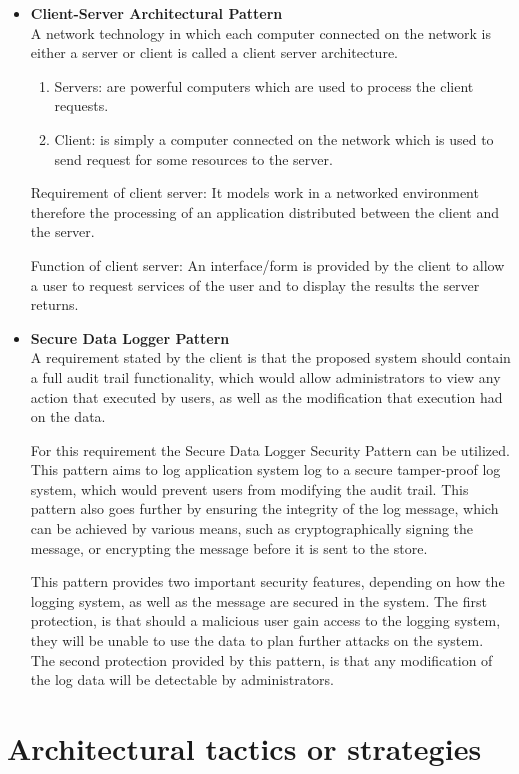 \documentclass[a4paper,10pt]{article}
\begin{document}
\begin{itemize}
		\item \textbf{Client-Server Architectural Pattern}\\
				A network technology in which each computer connected on the network is either a server or client is called a client server architecture.
				\begin{enumerate}
					\item Servers: are powerful computers which are used to process the client requests.
					\item Client: is simply a computer connected on the network which is used to send request for some resources to the server.
				\end{enumerate}
				Requirement of client server: It models work in a networked environment therefore the processing of an application distributed between the client and the server.

				Function of client server: An interface/form is provided by the client to allow a user to request services of the user and to display the results the server returns.

		\item \textbf{Secure Data Logger Pattern} \\
				A requirement stated by the client is that the proposed system should contain a full audit trail functionality, which would allow administrators to view any action that executed by users, as well as the modification that execution had on the data.

				For this requirement the Secure Data Logger Security Pattern can be utilized. This pattern aims to log application system log to a secure tamper-proof log system, which would prevent users from modifying the audit trail. This pattern also goes further by ensuring the integrity of the log message, which can be achieved by various means, such as cryptographically signing the message, or encrypting the message before it is sent to the store.

				This pattern provides two important security features, depending on how the logging system, as well as the message are secured in the system.  The first protection, is that should a malicious user gain access to the logging system, they will be unable to use the data to plan further attacks on the system.  The second protection provided by this pattern, is that any modification of the log data will be detectable by administrators.

	\end{itemize}
\section{Architectural tactics or strategies}
 
\end{document}
